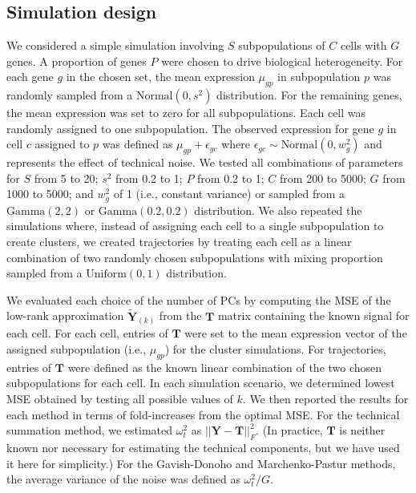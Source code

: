 \documentclass[10pt,letterpaper]{article}
\begin{document}
\subsection{Simulation design}
We considered a simple simulation involving $S$ subpopulations of $C$ cells with $G$ genes.
A proportion of genes $P$ were chosen to drive biological heterogeneity.
For each gene $g$ in the chosen set, the mean expression $\mu_{gp}$ in subpopulation $p$ was randomly sampled from a $\mbox{Normal}(0, s^2)$ distribution.
For the remaining genes, the mean expression was set to zero for all subpopulations.
Each cell was randomly assigned to one subpopulation.
The observed expression for gene $g$ in cell $c$ assigned to $p$ was defined as $\mu_{gp} + \epsilon_{gc}$ where $\epsilon_{gc} \sim \mbox{Normal}(0, w^2_g)$ and represents the effect of technical noise.
We tested all combinations of parameters for $S$ from 5 to 20; $s^2$ from 0.2 to 1; $P$ from 0.2 to 1; $C$ from 200 to 5000; $G$ from 1000 to 5000;
and $w^2_g$ of 1 (i.e., constant variance) or sampled from a $\mbox{Gamma}(2,2)$ or $\mbox{Gamma}(0.2,0.2)$ distribution.
We also repeated the simulations where, instead of assigning each cell to a single subpopulation to create clusters,
we created trajectories by treating each cell as a linear combination of two randomly chosen subpopulations with mixing proportion sampled from a $\mbox{Uniform}(0, 1)$ distribution.

We evaluated each choice of the number of PCs by computing the MSE of the low-rank approximation $\mathbf{\tilde Y}_{(k)}$ from the $\mathbf{T}$ matrix containing the known signal for each cell.
For each cell, entries of $\mathbf{T}$ were set to the mean expression vector of the assigned subpopulation (i.e., $\mu_{gp}$) for the cluster simulations.
For trajectories, entries of $\mathbf{T}$ were defined as the known linear combination of the two chosen subpopulations for each cell.
In each simulation scenario, we determined lowest MSE obtained by testing all possible values of $k$.
We then reported the results for each method in terms of fold-increases from the optimal MSE.
For the technical summation method, we estimated $\omega^2_t$ as $||\mathbf{Y} - \mathbf{T}||^2_F$.
(In practice, $\mathbf{T}$ is neither known nor necessary for estimating the technical components, but we have used it here for simplicity.)
For the Gavish-Donoho and Marchenko-Pastur methods, the average variance of the noise was defined as $\omega^2_t/G$.
\end{document}

